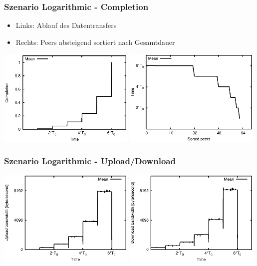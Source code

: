 \begin{frame}
  \frametitle{Szenario Logarithmic - Completion}
  \begin{itemize}  
    \item Links: Ablauf des Datentransfers
    \item Rechts: Peers absteigend sortiert nach Gesamtdauer
  \end{itemize}

  \begin{center}
    \includegraphics[width=0.49\textwidth]{fig/plots/scenario_3_log/plots/GeneratedMeanChunkCompletion.csv.eps}
    \hfill
    \includegraphics[width=0.49\textwidth]{fig/plots/scenario_3_log/plots/GeneratedMeanSortedChunkCompletion.csv.eps}
  \end{center}
\end{frame}


\begin{frame}
  \frametitle{Szenario Logarithmic - Upload/Download}
  \begin{center}
    \includegraphics[width=0.49\textwidth]{fig/plots/scenario_3_log/plots/GeneratedMeanCurrentUploadBandwidth.csv.eps}
    \includegraphics[width=0.49\textwidth]{fig/plots/scenario_3_log/plots/GeneratedMeanCurrentDownloadBandwidth.csv.eps}
  \end{center}
\end{frame}


